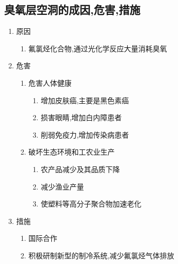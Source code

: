 \documentclass[a4paper]{article}
\begin{document}
    \subsection{臭氧层空洞的成因,危害,措施}
    \begin{enumerate}
        \item 原因
        \begin{enumerate}
            \item 氟氯烃化合物,通过光化学反应大量消耗臭氧
        \end{enumerate}
        \item 危害
        \begin{enumerate}
            \item 危害人体健康
            \begin{enumerate}
                \item 增加皮肤癌,主要是黑色素癌
                \item 损害眼睛,增加白内障患者
                \item 削弱免疫力,增加传染病患者
            \end{enumerate}
            \item 破坏生态环境和工农业生产
            \begin{enumerate}
                \item 农产品减少及其品质下降
                \item 减少渔业产量
                \item 使塑料等高分子聚合物加速老化
            \end{enumerate}
        \end{enumerate}
        \item 措施
        \begin{enumerate}
            \item 国际合作
            \item 积极研制新型的制冷系统,减少氟氯烃气体排放
        \end{enumerate}
    \end{enumerate}
\end{document}
